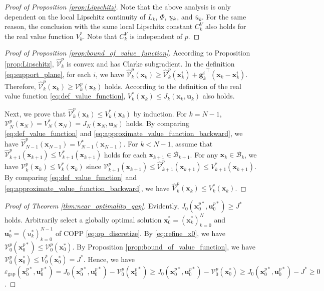 \documentclass[journal]{IEEEtran}
\theoremstyle{definition}
\theoremstyle{definition}
\renewcommand\vector[1]{\boldsymbol{#1}}
\newcommand\vg{{\vector{g}}}
\newcommand\vx{{\vector{x}}}
\newcommand\bx{{\mathbf{x}}}
\newcommand\bu{{\mathbf{u}}}
\DeclareRobustCommand{\underbar}[1]{\kern0.3\fontdimen2\font\underaccent{\bar}{\kern-0.3\fontdimen2\font #1}}
\begin{document}
\begin{proof}[Proof of Proposition \ref{prop:Lipschitz}]
    Note that the above analysis is only dependent on the local Lipschitz continuity of $L_k$, $\Phi$, $\underbar{u}_k$, and $\bar{u}_k$. For the same reason, the conclusion with the same local Lipschitz constant $C_k^V$ also holds for the real value function $V_k^*$. Note that $C_k^V$ is independent of $p$.
\end{proof}

\begin{proof}[Proof of Proposition \ref{prop:bound_of_value_function}]
    According to Proposition \ref{prop:Lipschitz}, $\widehat{\mathcal{V}}_k^p$ is convex and has Clarke subgradient. In the definition \eqref{eq:support_plane}, for each $i$, we have $\widehat{\mathcal{V}}_k^p(\vx_k)\geq\widehat{\mathcal{V}}_k^p(\vx_k^i)+{\vg_k^i}^\top(\vx_k-\vx_k^i)$. Therefore, $\widehat{\mathcal{V}}_k^p(\vx_k)\geq\mathcal{V}_k^p(\vx_k)$ holds. According to the definition of the real value function \eqref{eq:def_value_function}, $V_k^*(\vx_k)\leq J_k(\bx_k,\bu_k)$ also holds.

    Next, we prove that $\widehat{\mathcal{V}}_k^p(\vx_k)\leq V_k^*(\vx_k)$ by induction. For $k=N-1$, $\mathcal{V}_N^p(\vx_N)=V_N^*(\vx_N)=J_N(\bx_N,\bu_N)$ holds. By comparing \eqref{eq:def_value_function} and \eqref{eq:approximate_value_function_backward}, we have $\widehat{\mathcal{V}}_{N-1}^p(\vx_{N-1})=V_{N-1}^*(\vx_{N-1})$. For $k<N-1$, assume that $\widehat{\mathcal{V}}_{k+1}^p(\vx_{k+1})\leq V_{k+1}^*(\vx_{k+1})$ holds for each $\vx_{k+1}\in\mathcal{B}_{k+1}$. For any $\vx_k\in\mathcal{B}_k$, we have $\mathcal{V}_{k}^p(\vx_{k})\leq V_{k}^*(\vx_{k})$ since $\mathcal{V}_{k+1}^p(\vx_{k+1})\leq\widehat{\mathcal{V}}_{k+1}^p(\vx_{k+1})\leq V_{k+1}^*(\vx_{k+1})$. By comparing \eqref{eq:def_value_function} and \eqref{eq:approximate_value_function_backward}, we have $\widehat{\mathcal{V}}_k^p(\vx_k)\leq V_k^*(\vx_k)$.
\end{proof}

\begin{proof}[Proof of Theorem \ref{thm:near_optimality_gap}]
    Evidently, $J_0(\bx_0^{p*},\bu_0^{p*}) \geq J^*$ holds. Arbitrarily select a globally optimal solution $\bx_0^*=(\vx_k^*)_{k=0}^N$ and $\bu_0^*=(u_k^*)_{k=0}^{N-1}$ of COPP \eqref{eq:op_discretize}. By \eqref{eq:refine_x0}, we have $\mathcal{V}_0^p(\vx_0^{p*}) \leq \mathcal{V}_0^p(\vx_0^*)$. By Proposition \ref{prop:bound_of_value_function}, we have $\mathcal{V}_0^p(\vx_0^{*}) \leq V_0^*(\vx_0^{*}) = J^*$. Hence, we have $\varepsilon_\text{gap}(\bx_0^{p*},\bu_0^{p*}) = J_0(\bx_0^{p*},\bu_0^{p*}) - \mathcal{V}_0^p(\vx_0^{p*}) \geq J_0(\bx_0^{p*},\bu_0^{p*}) - \mathcal{V}_0^p(\vx_0^{*}) \geq J_0(\bx_0^{p*},\bu_0^{p*}) - J^* \geq 0$.
\end{proof}
\end{document}
